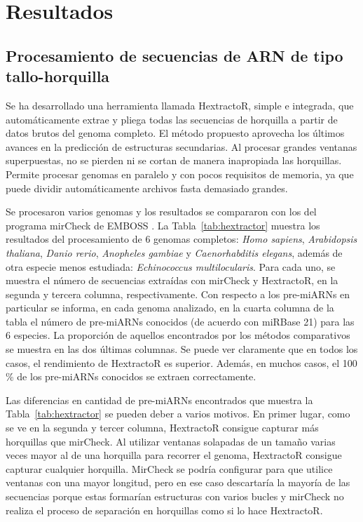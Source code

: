 \chapter{Resultados} \label{sec:results}

\section{Procesamiento de secuencias de ARN de tipo tallo-horquilla}

Se ha desarrollado una herramienta llamada HextractoR, simple e integrada, que automáticamente extrae y pliega todas las secuencias de horquilla a partir de
datos brutos del genoma completo. El método propuesto aprovecha los últimos avances en la predicción de estructuras secundarias. Al procesar grandes
ventanas superpuestas, no se pierden ni se cortan de manera inapropiada las horquillas. Permite procesar genomas en paralelo y con pocos requisitos de memoria,
ya que puede dividir automáticamente archivos fasta demasiado grandes.

Se procesaron varios genomas y los resultados se compararon con los del programa mirCheck de EMBOSS \citep{olson2002emboss}. La Tabla~\ref{tab:hextractor} muestra los
resultados del procesamiento de 6 genomas completos: \textit{Homo sapiens}, \textit{Arabidopsis thaliana}, \textit{Danio rerio}, \textit{Anopheles gambiae} y
\textit{Caenorhabditis elegans}, además de otra especie menos estudiada: \textit{Echinococcus multilocularis}. Para cada uno, se muestra el número de
secuencias extraídas con mirCheck y HextractoR, en la segunda y tercera columna, respectivamente. Con respecto a los pre-miARNs en particular se informa, en
cada genoma analizado, en la cuarta columna de la tabla el número de pre-miARNs conocidos (de acuerdo con miRBase 21) para las 6 especies. La proporción de
aquellos encontrados por los métodos comparativos se muestra en las dos últimas columnas. Se puede ver claramente que en todos los casos, el rendimiento de
HextractoR es superior. Además, en muchos casos, el 100 \% de los pre-miARNs conocidos se extraen correctamente.

Las diferencias en cantidad de pre-miARNs encontrados que muestra la Tabla~\ref{tab:hextractor} se pueden deber a varios motivos. En primer lugar, como se ve en
la segunda y tercer columna, HextractoR consigue capturar más horquillas que mirCheck. Al utilizar ventanas solapadas de un tamaño varias veces mayor al de
una horquilla para recorrer el genoma, HextractoR consigue capturar cualquier horquilla. MirCheck se podría configurar para que utilice ventanas con una mayor
longitud, pero en ese caso descartaría la mayoría de las secuencias porque estas formarían estructuras con varios bucles y mirCheck no realiza el proceso de
separación en horquillas como si lo hace HextractoR.

